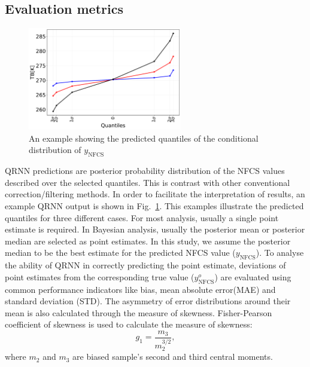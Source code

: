\documentclass[amt]{copernicus}
\newcommand{\ynfcs}{y_\text{NFCS}}
\newcommand{\yonfcs}{y^{o}_\text{NFCS}}
\begin{document}
\subsection{Evaluation metrics}
\label{sec:validation}
\begin{figure}[t]
	\centering
	\includegraphics[height=45mm]{Figures/posterior_distribution_I1V.pdf} 
	\caption{An example showing the predicted quantiles of the conditional distribution of $\ynfcs$ }
	\label{fig:posterior_distribution_I1V}	
\end{figure}
QRNN predictions are posterior probability distribution of the NFCS values described over the selected quantiles. This is contrast with other conventional correction/filtering methods. In order to facilitate the interpretation of results, an example QRNN output is shown in Fig.~\ref{fig:posterior_distribution_I1V}. This examples illustrate the predicted quantiles for three different cases. For most analysis, usually a single point estimate is required. In Bayesian analysis, usually the posterior mean or posterior median are selected as point estimates. In this study, we assume the posterior median to be the best estimate for the predicted NFCS value ($\ynfcs$). To analyse the ability of QRNN in correctly predicting the point estimate, deviations of point estimates from the corresponding true value ($\yonfcs$) are evaluated using common performance indicators like bias, mean absolute error(MAE) and standard deviation (STD). The asymmetry of error distributions around their mean is also calculated through the measure of skewness. Fisher-Pearson coefficient of skewness is used to calculate the measure of skewness: 
\begin{equation}
g_1 = \frac{m_3}{m_2^{3/2}}, 
\end{equation}
where $m_2$ and $m_3$ are biased sample's second and third central moments.
\end{document}

